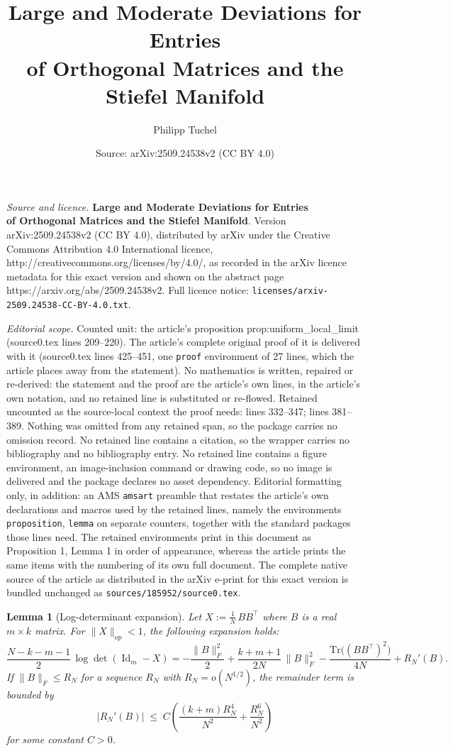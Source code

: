 \documentclass[10pt,a4paper]{amsart}
\title{\textbf{Large and Moderate Deviations for Entries\\ of Orthogonal Matrices and the Stiefel Manifold}}
\author{Philipp Tuchel}
\date{Source: arXiv:2509.24538v2 (CC BY 4.0)}
\newtheorem{lemma}{Lemma}
\begin{document}
\maketitle

\noindent\emph{Source and licence.} \textbf{Large and Moderate Deviations for Entries\\ of Orthogonal Matrices and the Stiefel Manifold}. Version arXiv:2509.24538v2 (CC BY 4.0), distributed by arXiv under the Creative Commons Attribution 4.0 International licence, http://creativecommons.org/licenses/by/4.0/, as recorded in the arXiv licence metadata for this exact version and shown on the abstract page https://arxiv.org/abs/2509.24538v2. Full licence notice: \texttt{licenses/arxiv-2509.24538-CC-BY-4.0.txt}.\par\smallskip

\noindent\textit{Editorial scope.} Counted unit: the article's proposition prop:uniform\_local\_limit (source0.tex lines 209--220). The article's complete original proof of it is delivered with it (source0.tex lines 425--451, one \texttt{proof} environment of 27 lines, which the article places away from the statement). No mathematics is written, repaired or re-derived: the statement and the proof are the article's own lines, in the article's own notation, and no retained line is substituted or re-flowed.  Retained uncounted as the source-local context the proof needs: lines 332--347; lines 381--389.  Nothing was omitted from any retained span, so the package carries no omission record.  No retained line contains a citation, so the wrapper carries no bibliography and no bibliography entry.  No retained line contains a figure environment, an image-inclusion command or drawing code, so no image is delivered and the package declares no asset dependency.  Editorial formatting only, in addition: an AMS \texttt{amsart} preamble that restates the article's own declarations and macros used by the retained lines, namely the environments \texttt{proposition}, \texttt{lemma} on separate counters, together with the standard packages those lines need.  The retained environments print in this document as Proposition 1, Lemma 1 in order of appearance, whereas the article prints the same items with the numbering of its own full document.  The complete native source of the article as distributed in the arXiv e-print for this exact version is bundled unchanged as \texttt{sources/185952/source0.tex}.
\begin{lemma}[Log-determinant expansion]
	\label{lem:log_det_expansion}
	Let \(X := \frac1N\,B B^\top\) where $B$ is a real $m\times k$ matrix. For \(\|X\|_{op}<1\), the following expansion holds:
	\[
	\frac{N-k-m-1}{2}\,\log\det(\operatorname{Id}_m - X)
	= -\frac{\|B\|_F^2}{2}
	  + \frac{k+m+1}{2N}\,\|B\|_F^2
	  - \frac{\mathrm{Tr}\bigl((BB^\top)^2\bigr)}{4N}
	  + R_N'(B).
	\]
	If \(\|B\|_F \le R_N\) for a sequence $R_N$ with \(R_N = o(N^{1/2})\), the remainder term is bounded by
	\[
	|R_N'(B)| \;\le\; C \left( \frac{(k+m)R_N^4}{N^2} + \frac{R_N^6}{N^2} \right)
	\]
	for some constant $C>0$.
\end{lemma}
\end{document}
